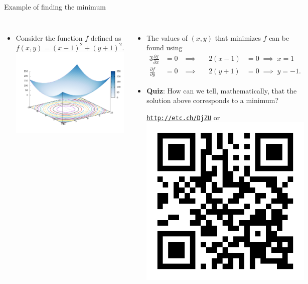 \begin{frame}{Example of finding the minimum}
\small
\begin{columns}[t]
	
\vskip 20pt
\begin{itemize}
\item Consider the function $f$ defined as
\[
f(x,y)=(x-1)^{2}+(y+1)^{2}.
\]
\vskip -5pt
\includegraphics[width=1\columnwidth]{figures/numerical-methods-chemical-equilibrium/parabolic-plot}
\end{itemize}

\vskip -10pt
\pause
\begin{itemize}
\item The values of $(x,y)$ that minimizes $f$ can be found using
\begin{alignat*}{3}
\frac{\partial f}{\partial x} & =0 \; & \implies & \; & 2(x-1) & = 0 \; \implies  \; x = 1\\
\frac{\partial f}{\partial y} & =0 & \implies &  & 2(y+1) & =0 \; \implies  \; y = -1.
\end{alignat*}
\pause
\item \alert{\textbf{Quiz}}: How can we tell, mathematically, that the solution
above corresponds to a minimum?
\begin{center}
	\href{http://etc.ch/DjZU}{\textcolor{indigo(dye)}{\tt http://etc.ch/DjZU}} \quad or \quad 
	\includegraphics[height=0.15\columnwidth]{figures/numerical-methods-chemical-equilibrium/polls.png}
\end{center}
\end{itemize}
\end{columns}
\end{frame}
